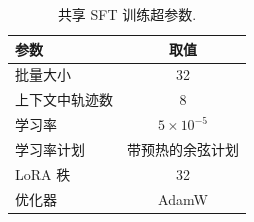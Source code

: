 \begin{longtable}{lc}
\caption{共享 SFT 训练超参数.}\label{cat-tab:SFTtrainingparams}\\

        \toprule
        参数 & 取值 \\
        \midrule
        批量大小 & 32 \\
        上下文中轨迹数 & 8 \\
        学习率 & $5 \times 10^{-5}$ \\
        学习率计划 & 带预热的余弦计划 \\
        LoRA \cite{cat-hu2022lora} 秩 & 32 \\
        优化器 & AdamW \cite{cat-loschilov2019decoupled} \\
        \bottomrule
    
\end{longtable}
